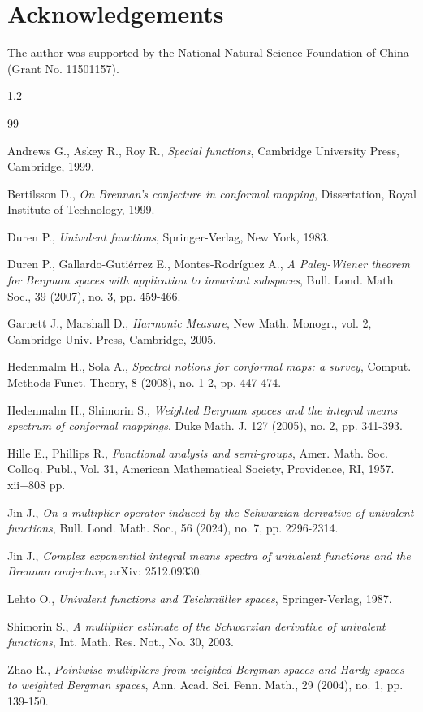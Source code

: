 \documentclass[10pt]{amsart}
\theoremstyle{definition}    %
\numberwithin{equation}{section}
\begin{document}
\section{{\bf Acknowledgements}}
The author was supported by the National Natural Science Foundation of China (Grant No. 11501157).
\begin{spacing}{1.2}
\begin{thebibliography}{99}

Andrews G., Askey R.,  Roy R.,  {\em Special functions},  Cambridge University Press, Cambridge, 1999.

Bertilsson D., {\em On Brennan's conjecture in conformal mapping}, Dissertation, Royal Institute of Technology, 1999.

 Duren P., {\em Univalent functions}, Springer-Verlag, New York, 1983.

Duren P., Gallardo-Gutiérrez E., Montes-Rodríguez A., {\em A Paley-Wiener theorem for Bergman spaces with application to invariant subspaces}, Bull. Lond. Math. Soc., 39 (2007), no. 3, pp. 459-466.

Garnett J., Marshall D., {\em Harmonic Measure}, New Math. Monogr., vol. 2, Cambridge Univ. Press, Cambridge, 2005.

   
Hedenmalm H., Sola A., {\em Spectral notions for conformal maps: a survey}, Comput. Methods Funct. Theory,  8 (2008), no. 1-2, pp. 447-474.

Hedenmalm H., Shimorin S., {\em Weighted Bergman spaces and the integral means spectrum of conformal mappings},  Duke Math. J. 127 (2005), no. 2, pp. 341-393.

Hille E., Phillips R., {\em Functional analysis and semi-groups}, Amer. Math. Soc. Colloq. Publ., Vol. 31,  American Mathematical Society, Providence, RI, 1957. xii+808 pp.

Jin J., {\em On a multiplier operator induced by the Schwarzian derivative of univalent functions}, Bull. Lond. Math. Soc., 56 (2024), no. 7, pp. 2296-2314.

Jin J., {\em Complex exponential integral means spectra of univalent functions and the Brennan conjecture}, arXiv: 2512.09330.

Lehto O., {\em Univalent functions and Teichm\"uller spaces}, Springer-Verlag, 1987.

Shimorin S., {\em A multiplier estimate of the Schwarzian derivative of univalent functions}, Int. Math. Res. Not., No. 30, 2003.

Zhao R., {\em  Pointwise multipliers from weighted Bergman spaces and Hardy spaces to weighted Bergman spaces}, Ann. Acad. Sci. Fenn. Math., 29 (2004), no. 1, pp. 139-150.
\end{thebibliography}

\end{spacing}
\end{document}
